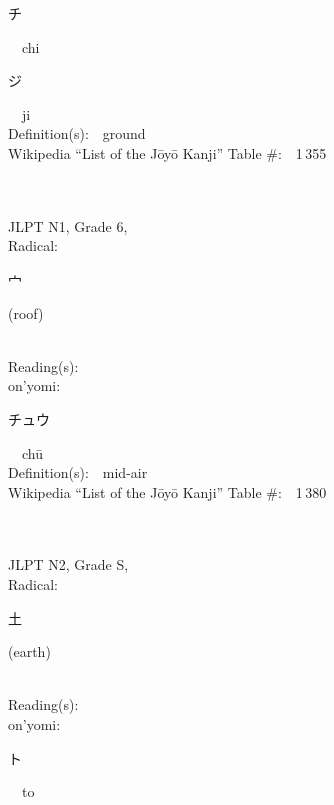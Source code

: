 \begin{multicols}{2}
{\hspace*{2em}}{\begin{CJK}{UTF8}{min} チ \end{CJK}}\ \ chi\ \ \\
{\hspace*{2em}}{\begin{CJK}{UTF8}{min} ジ \end{CJK}}\ \ ji\ \ \\
Definition(s):\ \ ground \\
Wikipedia ``List of the J\=oy\=o Kanji'' Table \#:\ \ 1\,355 \\
\ \ \\
{\fontsize{34pt}{40pt}  }\ \ \\  %
{JLPT N1, Grade 6, \\Radical:\ \ {\begin{CJK}{UTF8}{min} 宀 \end{CJK}} (roof) } \\
Reading(s):\ \ \\
{\hspace*{1em}}on'yomi:\ \ \\
{\hspace*{2em}}{\begin{CJK}{UTF8}{min} チュウ \end{CJK}}\ \ ch\=u\ \ \\
Definition(s):\ \ mid-air \\
Wikipedia ``List of the J\=oy\=o Kanji'' Table \#:\ \ 1\,380 \\
\ \ \\
{\fontsize{34pt}{40pt}  }\ \ \\  %
{JLPT N2, Grade S, \\Radical:\ \ {\begin{CJK}{UTF8}{min} 土 \end{CJK}} (earth) } \\
Reading(s):\ \ \\
{\hspace*{1em}}on'yomi:\ \ \\
{\hspace*{2em}}{\begin{CJK}{UTF8}{min} ト \end{CJK}}\ \ to\ \ \\

\end{multicols}
